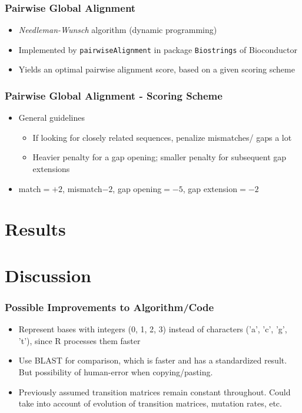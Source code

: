 \documentclass[xcolor=dvipsnames]{beamer} \usepackage{beamerthemesplit}
\begin{document}
\begin{frame}
	\frametitle{Pairwise Global Alignment}
	\begin{itemize}
		\item  \emph{Needleman-Wunsch} algorithm (dynamic programming)
		\item Implemented by \texttt{pairwiseAlignment} in package \texttt{Biostrings} of Bioconductor
		\item Yields an optimal pairwise alignment score, based on a given scoring scheme
	\end{itemize}
\end{frame}

\begin{frame}
	\frametitle{Pairwise Global Alignment - Scoring Scheme}
	\begin{itemize}
		\item General guidelines
			\begin{itemize}
			\item If looking for closely related sequences, penalize mismatches/ gaps a lot
			\item Heavier penalty for a gap opening; smaller penalty for subsequent gap extensions
			\end{itemize}
		\item match$=+2$, mismatch$-2$, gap opening$=-5$, gap extension$=-2$
	\end{itemize}
	\insertframenumber
\end{frame}


\section{Results}


\section{Discussion}
\begin{frame}
	\frametitle{Possible Improvements to Algorithm/Code}
    \begin{itemize}
    	\item Represent bases with integers (0, 1, 2, 3) instead of characters ('a', 'c', 'g', 't'), since R processes them faster
        \item Use BLAST for comparison, which is faster and has a standardized result. But possibility of human-error when copying/pasting.
        \item Previously assumed transition matrices remain constant throughout. Could take into account of evolution of transition matrices, mutation rates, etc.
    \end{itemize}
\end{frame}
\end{document}
